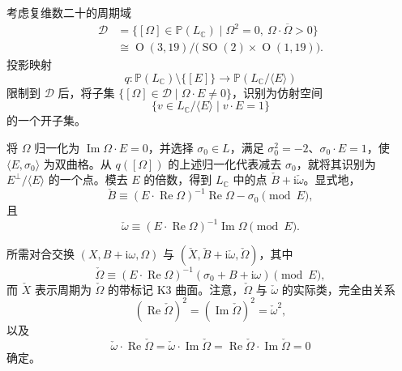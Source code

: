 考虑复维数二十的周期域
\[
\begin{aligned}
\mathcal D&=\{[\Omega]\in\mathbb P(L_{\mathbb C})
\mid\Omega^2=0,\ \Omega\cdot\overline\Omega>0\}\\
&\cong\operatorname O(3,19)/
\bigl(\operatorname{SO}(2)\times\operatorname O(1,19)\bigr).
\end{aligned}
\]
投影映射
\[
q\colon\mathbb P(L_{\mathbb C})\setminus\{[E]\}
\longrightarrow\mathbb P(L_{\mathbb C}/\langle E\rangle)
\]
限制到 $\mathcal D$ 后，将子集 $\{[\Omega]\in\mathcal D\mid\Omega\cdot E\neq0\}$，识别为仿射空间
\[
\{v\in L_{\mathbb C}/\langle E\rangle\mid v\cdot E=1\}
\]
的一个开子集。

将 $\Omega$ 归一化为 $\operatorname{Im}\Omega\cdot E=0$，并选择 $\sigma_0\in L$，满足 $\sigma_0^2=-2$、$\sigma_0\cdot E=1$，使 $\langle E,\sigma_0\rangle$ 为双曲格。从 $q([\Omega])$ 的上述归一化代表减去 $\sigma_0$，就将其识别为 $E^\perp/\langle E\rangle$ 的一个点。模去 $E$ 的倍数，得到 $L_{\mathbb C}$ 中的点 $\check B+\mathrm i\check\omega$。显式地，
\[
\check B\equiv(E\cdot\operatorname{Re}\Omega)^{-1}
\operatorname{Re}\Omega-\sigma_0\pmod E,
\]
且
\begin{equation}\label{eq:7.6}
\check\omega\equiv(E\cdot\operatorname{Re}\Omega)^{-1}
\operatorname{Im}\Omega\pmod E.
\end{equation}

所需对合交换 $(X,B+\mathrm i\omega,\Omega)$ 与 $(\check X,\check B+\mathrm i\check\omega,\check\Omega)$，其中
\begin{equation}\label{eq:7.7}
\check\Omega\equiv(E\cdot\operatorname{Re}\Omega)^{-1}
(\sigma_0+B+\mathrm i\omega)\pmod E,
\end{equation}
而 $\check X$ 表示周期为 $\check\Omega$ 的带标记 K3 曲面。注意，$\check\Omega$ 与 $\check\omega$ 的实际类，完全由关系
\[
(\operatorname{Re}\check\Omega)^2
=(\operatorname{Im}\check\Omega)^2=\check\omega^2,
\]
以及
\[
\check\omega\cdot\operatorname{Re}\check\Omega
=\check\omega\cdot\operatorname{Im}\check\Omega
=\operatorname{Re}\check\Omega\cdot\operatorname{Im}\check\Omega=0
\]
确定。

